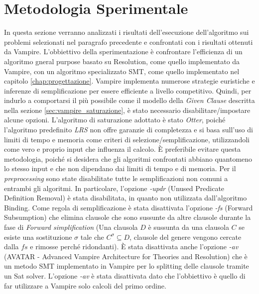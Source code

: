 \documentclass[./main.tex]{subfiles}
\begin{document}
\section{Metodologia Sperimentale}
In questa sezione verranno analizzati i risultati dell'esecuzione dell'algoritmo sui problemi selezionati nel paragrafo precedente
e confrontati con i risultati ottenuti da Vampire. 
L'obbiettivo della sperimentazione è confrontare l'efficienza di un algoritmo gneral purpose basato su Resolution, come quello implementato da Vampire,
con un algoritmo specializzato SMT, come quello implementato nel capitolo \ref{chap:progettazione}.
Vampire implementa numerose strategie euristiche e inferenze di semplificazione per essere efficiente a livello competitivo.
Quindi, per indurlo a comportarsi il più possibile come il modello della \textit{Given Clause} descritta 
nella sezione \ref{sec:vampire_saturazione}, è stato necessario disabilitare/impostare alcune opzioni.
L'algoritmo di saturazione adottato è stato \textit{Otter}, 
poiché l'algoritmo predefinito \textit{LRS} non offre garanzie di completezza e
si basa sull'uso di limiti di tempo e memoria come criteri di selezione/semplificazione, 
utilizzandoli come vero e proprio input che influenza il calcolo. 
È preferibile evitare questa metodologia, poiché si desidera che gli algoritmi confrontati abbiano quantomeno lo stesso input
e che non dipendano dai limiti di tempo e di memoria.
Per il \textit{preprocessing} sono state disabilitate tutte le semplificazioni non comuni a entrambi gli algoritmi.
In particolare, l'opzione \textit{-updr} (Unused Predicate Definition Removal) è stata disabilitata, in quanto non utilizzata dall'algoritmo
Binding. 
Come regola di semplificazione è stata disattivata l'opzione \textit{-fs} (Forward Subsumption) che elimina 
clausole che sono sussunte da altre clausole durante la fase di \textit{Forward simplification} 
(Una clausola $D$ è sussunta da una clausola $C$ se esiste una sostituzione $\sigma$ tale che 
$C^\sigma \subseteq D$, clausole del genere vengono cercate dalla $fs$ e rimosse perché ridondanti).
È stata disattivata anche l'opzione \textit{-av} (AVATAR - Advanced Vampire Architecture
for Theories and Resolution) che è un metodo SMT implementato in Vampire per lo splitting delle clausole tramite un Sat solver.
L'opzione \textit{-av} è stata disattivata dato che l'obbiettivo è quello di far utilizzare a Vampire solo calcoli del primo ordine.
\end{document}
